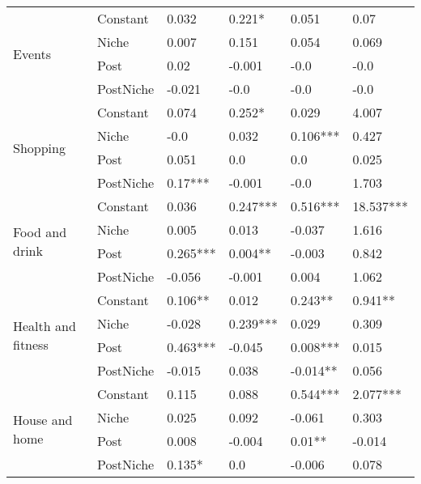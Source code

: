 \begin{longtable}[h!]{llllll}
\cline{1-6}
\multirow{4}{*}{Events} & Constant &               0.032 &      0.221* &      0.051 &       0.07 \\
          & Niche &               0.007 &       0.151 &      0.054 &      0.069 \\
          & Post &                0.02 &      -0.001 &       -0.0 &       -0.0 \\
          & PostNiche &              -0.021 &        -0.0 &       -0.0 &       -0.0 \\
\cline{1-6}
\multirow{4}{*}{Shopping} & Constant &               0.074 &      0.252* &      0.029 &      4.007 \\
          & Niche &                -0.0 &       0.032 &   0.106*** &      0.427 \\
          & Post &               0.051 &         0.0 &        0.0 &      0.025 \\
          & PostNiche &             0.17*** &      -0.001 &       -0.0 &      1.703 \\
\cline{1-6}
\multirow{4}{*}{Food and drink} & Constant &               0.036 &    0.247*** &   0.516*** &  18.537*** \\
          & Niche &               0.005 &       0.013 &     -0.037 &      1.616 \\
          & Post &            0.265*** &     0.004** &     -0.003 &      0.842 \\
          & PostNiche &              -0.056 &      -0.001 &      0.004 &      1.062 \\
\cline{1-6}
\multirow{4}{*}{Health and fitness} & Constant &             0.106** &       0.012 &    0.243** &    0.941** \\
          & Niche &              -0.028 &    0.239*** &      0.029 &      0.309 \\
          & Post &            0.463*** &      -0.045 &   0.008*** &      0.015 \\
          & PostNiche &              -0.015 &       0.038 &   -0.014** &      0.056 \\
\cline{1-6}
\multirow{4}{*}{House and home} & Constant &               0.115 &       0.088 &   0.544*** &   2.077*** \\
          & Niche &               0.025 &       0.092 &     -0.061 &      0.303 \\
          & Post &               0.008 &      -0.004 &     0.01** &     -0.014 \\
          & PostNiche &              0.135* &         0.0 &     -0.006 &      0.078 \\

\end{longtable}
